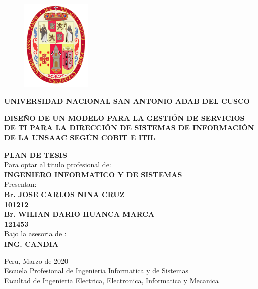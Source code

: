 \documentclass[12pt,a4paper]{article}
\author{Jose C. Nina Cruz y Wilian D. Huanca Marca}
\begin{document}
\begin{figure}
  \centering
    \includegraphics[width=0.3\textwidth]{logo.png}
\end{figure}
\textbf{UNIVERSIDAD NACIONAL SAN ANTONIO ADAB DEL CUSCO}\\

\begin{center}
\textbf{DISEÑO DE UN MODELO PARA LA GESTIÓN DE SERVICIOS DE TI PARA LA DIRECCIÓN DE SISTEMAS DE INFORMACIÓN DE LA UNSAAC SEGÚN COBIT E ITIL}
\end{center}
\begin{flushright}
\textbf{PLAN DE TESIS}\\
\vspace{15pt}
Para optar al titulo profesional de:\\
\textbf{INGENIERO INFORMATICO Y DE SISTEMAS}\\
Presentan:\\
\textbf{Br. JOSE CARLOS NINA CRUZ}\\
\textbf{101212}\\
\textbf{Br. WILIAN DARIO HUANCA MARCA}\\
\textbf{121453}\\
Bajo la asesoria de :\\
\textbf{ING.  CANDIA}
\end{flushright}
\begin{center}
\vspace{30pt}
Peru, Marzo de 2020\\
\vspace{30pt}
Escuela Profesional de Ingenieria Informatica y de Sistemas\\
\vspace{15pt}
Facultad de Ingenieria Electrica, Electronica, Informatica y Mecanica
\end{center}
\end{document}
